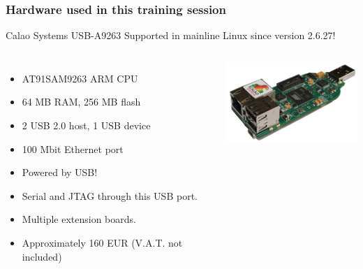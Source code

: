 \begin{frame}
\frametitle{Hardware used in this training session}
  Calao Systems USB-A9263
  Supported in mainline Linux since version 2.6.27!
  \begin{columns}
    \begin{itemize}
      \item AT91SAM9263 ARM CPU
      \item 64 MB RAM, 256 MB flash
      \item 2 USB 2.0 host, 1 USB device
      \item 100 Mbit Ethernet port
      \item Powered by USB!
      \item Serial and JTAG through this USB port.
      \item Multiple extension boards.
      \item Approximately 160 EUR (V.A.T. not included)
    \end{itemize}
    \includegraphics[width=\textwidth]{slides/calao-board/calao-usb9263.png}
  \end{columns}
\end{frame}
